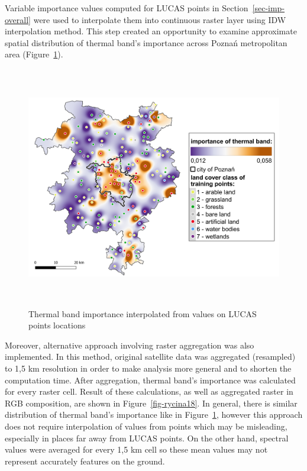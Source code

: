 \documentclass{amuthesis}
\begin{document}
Variable importance values computed for LUCAS points in
Section~\ref{sec-imp-overall} were used to interpolate them into
continuous raster layer using IDW interpolation method. This step
created an opportunity to examine approximate spatial distribution of
thermal band's importance across Poznań metropolitan area
(Figure~\ref{fig-rycina17}).

\begin{figure}[H]

{\centering \includegraphics[width=5.875in,height=4.16667in]{./figures/B10_importance-spatial-ENG.png}

}

\caption{\label{fig-rycina17}Thermal band importance interpolated from
values on LUCAS points locations}

\end{figure}

Moreover, alternative approach involving raster aggregation was also
implemented. In this method, original satellite data was aggregated
(resampled) to 1,5 km resolution in order to make analysis more general
and to shorten the computation time. After aggregation, thermal band's
importance was calculated for every raster cell. Result of these
calculations, as well as aggregated raster in RGB composition, are shown
in Figure~\ref{fig-rycina18}. In general, there is similar distribution
of thermal band's importance like in Figure~\ref{fig-rycina17}, however
this approach does not require interpolation of values from points which
may be misleading, especially in places far away from LUCAS points. On
the other hand, spectral values were averaged for every 1,5 km cell so
these mean values may not represent accurately features on the ground.
\end{document}
